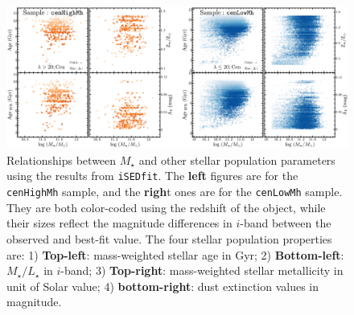 \documentclass{emulateapj}
\def\rbcg{\texttt{cenHighMh}}
\def\nbcg{\texttt{cenLowMh}}
\def\mstar{{$M_{\star}$}}
\def\m2l{{$M_{\star}/L_{\star}$}}
\begin{document}
\begin{CJK*}{UTF8}{gbsn}
    \begin{figure}[hbt!]
        \begin{center}
        \includegraphics[width=\textwidth]{fig/redbcg_isedfit_2.pdf}
        \caption{Relationships between \mstar{} and other stellar population 
            parameters using the results from \texttt{iSEDfit}. 
            The \textbf{left} figures are for the \rbcg{} sample, and the 
            \textbf{righ}t ones are 
            for the \nbcg{} sample. 
            They are both color-coded using the redshift of the object, while 
            their sizes reflect the magnitude differences in $i$-band between 
            the observed and best-fit value. 
            The four stellar population properties are: 
            1) \textbf{Top-left}: mass-weighted stellar age in Gyr; 
            2) \textbf{Bottom-left}: \m2l{} in $i$-band; 
            3) \textbf{Top-right}: mass-weighted stellar metallicity in unit of Solar 
            value;
            4) \textbf{bottom-right}: dust extinction values in magnitude.}
        \label{fig:ised_2}
        \end{center}
    \end{figure}


\end{CJK*}
\end{document}
